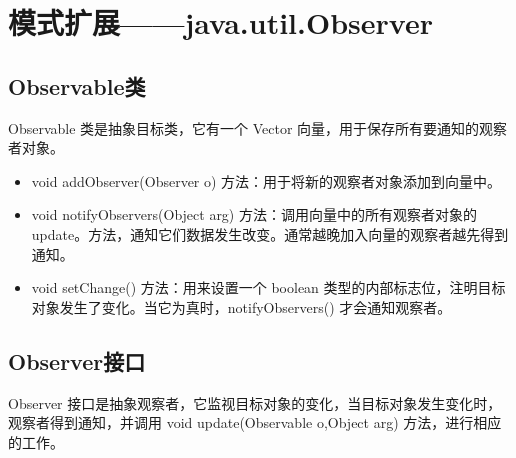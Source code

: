 \section{模式扩展——java.util.Observer}
\subsection{Observable类}
Observable 类是抽象目标类，它有一个 Vector 向量，用于保存所有要通知的观察者对象。
\begin{itemize}
	\item void addObserver(Observer o) 方法：用于将新的观察者对象添加到向量中。
	\item void notifyObservers(Object arg) 方法：调用向量中的所有观察者对象的 update。方法，通知它们数据发生改变。通常越晚加入向量的观察者越先得到通知。
	\item void setChange() 方法：用来设置一个 boolean 类型的内部标志位，注明目标对象发生了变化。当它为真时，notifyObservers() 才会通知观察者。
\end{itemize}
\subsection{Observer接口}
Observer 接口是抽象观察者，它监视目标对象的变化，当目标对象发生变化时，观察者得到通知，并调用 void update(Observable o,Object arg) 方法，进行相应的工作。
